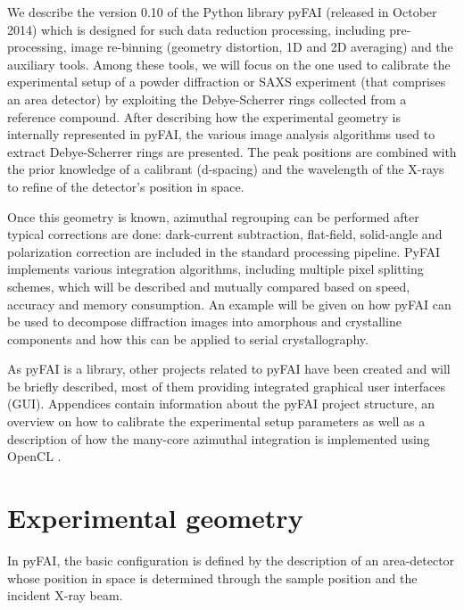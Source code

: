 \documentclass{iucr}
\begin{document}
We describe the version 0.10 of the Python library pyFAI 
(released in October 2014) which is designed for such data reduction processing,
including pre-processing, image re-binning (geometry distortion, 1D and 2D
averaging) and the auxiliary tools. 
Among these tools, we will focus on the one used to
calibrate the experimental setup of a powder diffraction  
or SAXS experiment (that comprises
an area detector) by exploiting the Debye-Scherrer rings collected from a
reference compound.
After describing how the experimental geometry is internally represented in
pyFAI, the various image analysis algorithms used to extract Debye-Scherrer
rings are presented.
The peak positions are combined with the prior knowledge of a calibrant
(d-spacing) and the wavelength of the X-rays  to refine of the detector's position in space.

Once this geometry is known, azimuthal regrouping can be performed after
typical corrections are done: dark-current subtraction, flat-field,
solid-angle and polarization correction are included in the standard processing
pipeline.
PyFAI implements various integration algorithms, including
multiple pixel splitting schemes, which will be described and mutually compared
based on speed, accuracy and memory consumption.
An example will be given on how pyFAI can be used to decompose
diffraction images into amorphous and crystalline components and how this can be
applied to serial crystallography.

As pyFAI is a library, other projects related to pyFAI have been created and
will be briefly described, most of them providing integrated
graphical user interfaces (GUI).
Appendices contain information about the pyFAI project structure, an
overview on how to calibrate the experimental setup parameters as well as
a description of how the many-core azimuthal integration is implemented using
OpenCL \cite{opencl}.

\section{Experimental geometry}

In pyFAI, the basic configuration is defined by the description of an
area-detector whose position in space is determined through the sample
position and the incident X-ray beam.
\end{document}
